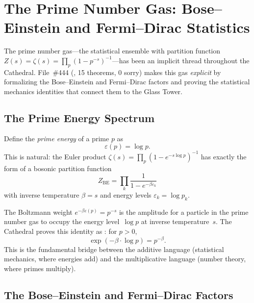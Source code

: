 \section{The Prime Number Gas: Bose--Einstein and Fermi--Dirac Statistics}
\label{sec:bose-einstein}

The prime number gas---the statistical ensemble with partition function
$Z(s) = \zeta(s) = \prod_p (1 - p^{-s})^{-1}$---has been an implicit
thread throughout the Cathedral. File~\#444
(, 15 theorems, 0 sorry)
makes this gas \emph{explicit} by formalizing the Bose--Einstein and
Fermi--Dirac factors and proving the statistical mechanics identities
that connect them to the Glass Tower.

\subsection{The Prime Energy Spectrum}

Define the \emph{prime energy} of a prime $p$ as
\begin{equation}
  \varepsilon(p) = \log p.
  \label{eq:prime-energy}
\end{equation}
This is natural: the Euler product $\zeta(s) = \prod_p (1-e^{-s\log p})^{-1}$
has exactly the form of a bosonic partition function
\[
  Z_{\mathrm{BE}} = \prod_k \frac{1}{1 - e^{-\beta \varepsilon_k}}
\]
with inverse temperature $\beta = s$ and energy levels $\varepsilon_k = \log p_k$.

\begin{correspondence}[Prime Energy = Boltzmann Weight]
The Boltzmann weight $e^{-\beta \varepsilon(p)} = p^{-s}$ is the
amplitude for a particle in the prime number gas to occupy the energy
level~$\log p$ at inverse temperature~$s$. The Cathedral proves this
identity as : for $p > 0$,
\[
  \exp(-\beta \cdot \log p) = p^{-\beta}.
\]
This is the fundamental bridge between the additive language
(statistical mechanics, where energies add) and the multiplicative
language (number theory, where primes multiply).
\end{correspondence}

\subsection{The Bose--Einstein and Fermi--Dirac Factors}

